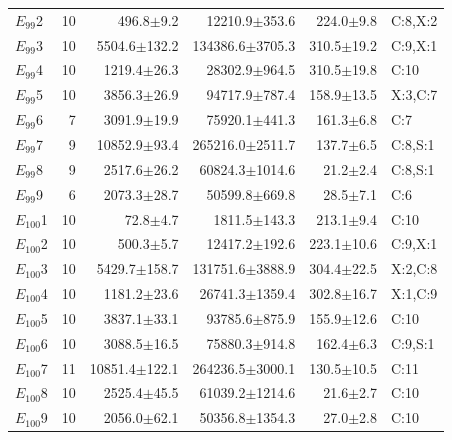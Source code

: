 \begin{supertabular}{@{}lrrrrl@{}}
$E_{99}$2 & 10 & 496.8$\pm$9.2 & 12210.9$\pm$353.6 & 224.0$\pm$9.8 & C:8,X:2 \\
$E_{99}$3 & 10 & 5504.6$\pm$132.2 & 134386.6$\pm$3705.3 & 310.5$\pm$19.2 & C:9,X:1 \\
$E_{99}$4 & 10 & 1219.4$\pm$26.3 & 28302.9$\pm$964.5 & 310.5$\pm$19.8 & C:10 \\
$E_{99}$5 & 10 & 3856.3$\pm$26.9 & 94717.9$\pm$787.4 & 158.9$\pm$13.5 & X:3,C:7 \\
$E_{99}$6 & 7 & 3091.9$\pm$19.9 & 75920.1$\pm$441.3 & 161.3$\pm$6.8 & C:7 \\
$E_{99}$7 & 9 & 10852.9$\pm$93.4 & 265216.0$\pm$2511.7 & 137.7$\pm$6.5 & C:8,S:1 \\
$E_{99}$8 & 9 & 2517.6$\pm$26.2 & 60824.3$\pm$1014.6 & 21.2$\pm$2.4 & C:8,S:1 \\
$E_{99}$9 & 6 & 2073.3$\pm$28.7 & 50599.8$\pm$669.8 & 28.5$\pm$7.1 & C:6 \\
$E_{100}$1 & 10 & 72.8$\pm$4.7 & 1811.5$\pm$143.3 & 213.1$\pm$9.4 & C:10 \\
$E_{100}$2 & 10 & 500.3$\pm$5.7 & 12417.2$\pm$192.6 & 223.1$\pm$10.6 & C:9,X:1 \\
$E_{100}$3 & 10 & 5429.7$\pm$158.7 & 131751.6$\pm$3888.9 & 304.4$\pm$22.5 & X:2,C:8 \\
$E_{100}$4 & 10 & 1181.2$\pm$23.6 & 26741.3$\pm$1359.4 & 302.8$\pm$16.7 & X:1,C:9 \\
$E_{100}$5 & 10 & 3837.1$\pm$33.1 & 93785.6$\pm$875.9 & 155.9$\pm$12.6 & C:10 \\
$E_{100}$6 & 10 & 3088.5$\pm$16.5 & 75880.3$\pm$914.8 & 162.4$\pm$6.3 & C:9,S:1 \\
$E_{100}$7 & 11 & 10851.4$\pm$122.1 & 264236.5$\pm$3000.1 & 130.5$\pm$10.5 & C:11 \\
$E_{100}$8 & 10 & 2525.4$\pm$45.5 & 61039.2$\pm$1214.6 & 21.6$\pm$2.7 & C:10 \\
$E_{100}$9 & 10 & 2056.0$\pm$62.1 & 50356.8$\pm$1354.3 & 27.0$\pm$2.8 & C:10 \\
\end{supertabular}
\endgroup
